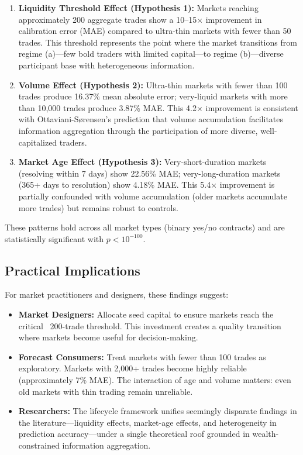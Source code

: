 \begin{enumerate}
\item \textbf{Liquidity Threshold Effect (Hypothesis 1):} Markets reaching approximately 200 aggregate trades show a 10--15$\times$ improvement in calibration error (MAE) compared to ultra-thin markets with fewer than 50 trades. This threshold represents the point where the market transitions from regime (a)---few bold traders with limited capital---to regime (b)---diverse participant base with heterogeneous information.

\item \textbf{Volume Effect (Hypothesis 2):} Ultra-thin markets with fewer than 100 trades produce 16.37\% mean absolute error; very-liquid markets with more than 10,000 trades produce 3.87\% MAE. This 4.2$\times$ improvement is consistent with Ottaviani-Sørensen's prediction that volume accumulation facilitates information aggregation through the participation of more diverse, well-capitalized traders.

\item \textbf{Market Age Effect (Hypothesis 3):} Very-short-duration markets (resolving within 7 days) show 22.56\% MAE; very-long-duration markets (365+ days to resolution) show 4.18\% MAE. This 5.4$\times$ improvement is partially confounded with volume accumulation (older markets accumulate more trades) but remains robust to controls.
\end{enumerate}

These patterns hold across all market types (binary yes/no contracts) and are statistically significant with $p < 10^{-100}$.

\subsection{Practical Implications}
\label{subsec:practical}

For market practitioners and designers, these findings suggest:

\begin{itemize}
\item \textbf{Market Designers:} Allocate seed capital to ensure markets reach the critical ~200-trade threshold. This investment creates a quality transition where markets become useful for decision-making.

\item \textbf{Forecast Consumers:} Treat markets with fewer than 100 trades as exploratory. Markets with 2,000+ trades become highly reliable (approximately 7\% MAE). The interaction of age and volume matters: even old markets with thin trading remain unreliable.

\item \textbf{Researchers:} The lifecycle framework unifies seemingly disparate findings in the literature---liquidity effects, market-age effects, and heterogeneity in prediction accuracy---under a single theoretical roof grounded in wealth-constrained information aggregation.
\end{itemize}

